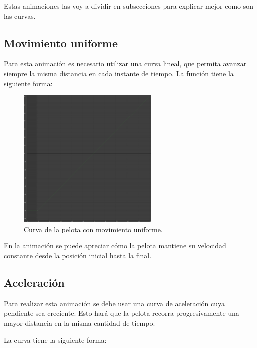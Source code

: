 \documentclass{article}
\begin{document}
Estas animaciones las voy a dividir en subsecciones para explicar mejor como son las curvas.

\newpage

\subsection{Movimiento uniforme}

Para esta animación es necesario utilizar una curva lineal, que permita avanzar siempre la misma distancia en cada instante de tiempo. La función tiene la siguiente forma:

\begin{figure}[H]
    \centering
    \includegraphics[width=0.6\textwidth]{imagenes/Ejercicio 1/curvas/uniforme.png}
    \caption{Curva de la pelota con movimiento uniforme.}
\end{figure}

En la animación se puede apreciar cómo la pelota mantiene su velocidad constante desde la posición inicial hasta la final.

\newpage

\subsection{Aceleración}

Para realizar esta animación se debe usar una curva de aceleración cuya pendiente sea creciente. Esto hará que la pelota recorra progresivamente una mayor distancia en la misma cantidad de tiempo.

\bigskip

La curva tiene la siguiente forma:
\end{document}
